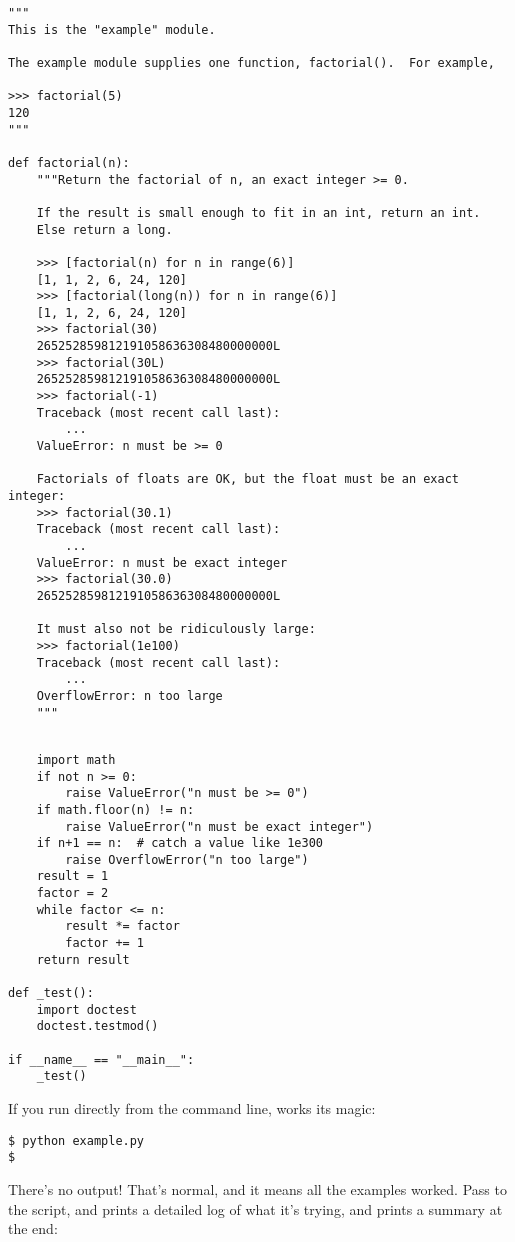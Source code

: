 \begin{verbatim}
"""
This is the "example" module.

The example module supplies one function, factorial().  For example,

>>> factorial(5)
120
"""

def factorial(n):
    """Return the factorial of n, an exact integer >= 0.

    If the result is small enough to fit in an int, return an int.
    Else return a long.

    >>> [factorial(n) for n in range(6)]
    [1, 1, 2, 6, 24, 120]
    >>> [factorial(long(n)) for n in range(6)]
    [1, 1, 2, 6, 24, 120]
    >>> factorial(30)
    265252859812191058636308480000000L
    >>> factorial(30L)
    265252859812191058636308480000000L
    >>> factorial(-1)
    Traceback (most recent call last):
        ...
    ValueError: n must be >= 0

    Factorials of floats are OK, but the float must be an exact integer:
    >>> factorial(30.1)
    Traceback (most recent call last):
        ...
    ValueError: n must be exact integer
    >>> factorial(30.0)
    265252859812191058636308480000000L

    It must also not be ridiculously large:
    >>> factorial(1e100)
    Traceback (most recent call last):
        ...
    OverflowError: n too large
    """

\end{verbatim}
\begin{verbatim}

    import math
    if not n >= 0:
        raise ValueError("n must be >= 0")
    if math.floor(n) != n:
        raise ValueError("n must be exact integer")
    if n+1 == n:  # catch a value like 1e300
        raise OverflowError("n too large")
    result = 1
    factor = 2
    while factor <= n:
        result *= factor
        factor += 1
    return result

def _test():
    import doctest
    doctest.testmod()

if __name__ == "__main__":
    _test()
\end{verbatim}

If you run  directly from the command line,
 works its magic:

\begin{verbatim}
$ python example.py
$
\end{verbatim}

There's no output!  That's normal, and it means all the examples
worked.  Pass  to the script, and 
prints a detailed log of what it's trying, and prints a summary at the
end:

